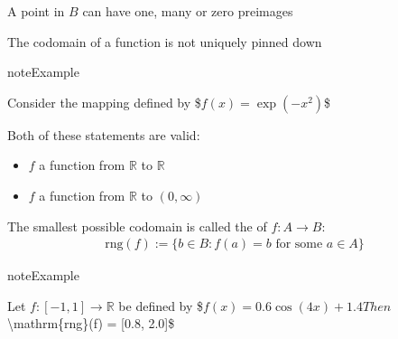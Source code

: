 \documentclass[letterpaper,10pt,english]{jupyterBook}
\begin{document}
\sphinxAtStartPar
A point in \(B\) can have one, many or zero preimages

\begin{figure}[htbp]
\centering

\noindent{}
\end{figure}

\sphinxAtStartPar
The codomain of a function is not uniquely pinned down

\begin{sphinxadmonition}{note}{Example}

\sphinxAtStartPar
Consider the mapping defined by
\$\(f(x) = \exp(-x^2)\)\$

\sphinxAtStartPar
Both of these statements are valid:
\begin{itemize}
\item {} 
\sphinxAtStartPar
\(f\) a function from \(\mathbb{R}\) to \(\mathbb{R}\)

\item {} 
\sphinxAtStartPar
\(f\) a function from \(\mathbb{R}\) to \((0, \infty)\)

\end{itemize}
\end{sphinxadmonition}

\sphinxAtStartPar
The smallest possible codomain is called the  of \(f \colon A \to B\):
\begin{equation*}
\begin{split}
\mathrm{rng}(f) := \{ b \in B : f(a) = b \text{ for some } a \in A \} 
\end{split}
\end{equation*}
\begin{figure}[htbp]
\centering

\noindent{}
\end{figure}

\begin{sphinxadmonition}{note}{Example}

\sphinxAtStartPar
Let \(f \colon [-1, 1] \to \mathbb{R}\) be defined by
\$\(
f(x) =  0.6 \cos(4 x) + 1.4
\)\(
Then \)\textbackslash{}mathrm\{rng\}(f) = {[}0.8, 2.0{]}\$
\end{sphinxadmonition}

\begin{figure}[htbp]
\centering

\noindent{}
\end{figure}
\end{document}
